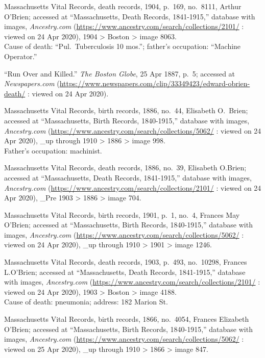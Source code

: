 \begin{thebibliography}{999}
	Massachusetts Vital Records, death records, 1904, p.\ 169, no.\ 8111, Arthur O'Brien; accessed at ``Massachusetts, Death Records, 1841-1915,'' database with images, \textit{Ancestry.com} (\url{https://www.ancestry.com/search/collections/2101/} : viewed on 24 Apr 2020), 1904 > Boston > image 8063.\\
	Cause of death: ``Pul.\ Tuberculosis 10 mos.''; father's occupation: ``Machine Operator.''
	
	``Run Over and Killed.'' \textit{The Boston Globe}, 25 Apr 1887, p.\ 5; accessed at \textit{Newspapers.com} (\url{https://www.newspapers.com/clip/33349423/edward-obrien-death/} : viewed on 24 Apr 2020).
	
	Massachusetts Vital Records, birth records, 1886, no.\ 44, Elisabeth O.\ Brien; accessed at ``Massachusetts, Birth Records, 1840-1915,'' database with images, \textit{Ancestry.com} (\url{https://www.ancestry.com/search/collections/5062/} : viewed on 24 Apr 2020), \_up through 1910 > 1886 > image 998.\\
	Father's occupation: machinist.
	
	Massachusetts Vital Records, death records, 1886, no.\ 39, Elisabeth O.Brien; accessed at ``Massachusetts, Death Records, 1841-1915,'' database with images, \textit{Ancestry.com} (\url{https://www.ancestry.com/search/collections/2101/} : viewed on 24 Apr 2020), \_Pre 1903 > 1886 > image 704.	
	
	Massachusetts Vital Records, birth records, 1901, p.\ 1, no.\ 4, Frances May O'Brien; accessed at ``Massachusetts, Birth Records, 1840-1915,'' database with images, \textit{Ancestry.com} (\url{https://www.ancestry.com/search/collections/5062/} : viewed on 24 Apr 2020), \_up through 1910 > 1901 > image 1246.
	
	Massachusetts Vital Records, death records, 1903, p.\ 493, no.\ 10298, Frances L.O'Brien; accessed at ``Massachusetts, Death Records, 1841-1915,'' database with images, \textit{Ancestry.com} (\url{https://www.ancestry.com/search/collections/2101/} : viewed on 24 Apr 2020), 1903 > Boston > image 4188.\\
	Cause of death: pneumonia; address: 182 Marion St.
	
	Massachusetts Vital Records, birth records, 1866, no.\ 4054, Frances Elizabeth O'Brien; accessed at ``Massachusetts, Birth Records, 1840-1915,'' database with images, \textit{Ancestry.com} (\url{https://www.ancestry.com/search/collections/5062/} : viewed on 25 Apr 2020), \_up through 1910 > 1866 > image 847.
	

\end{thebibliography}
